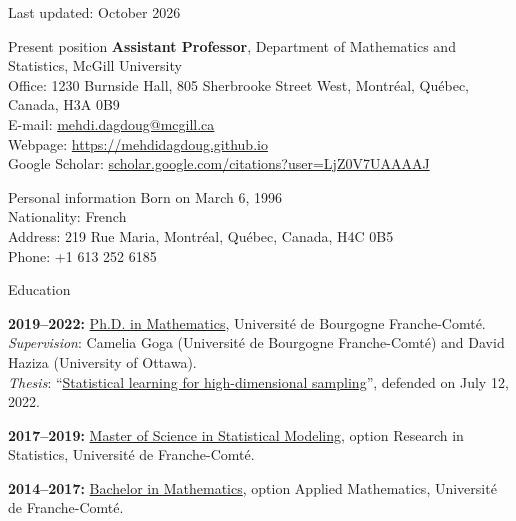 \documentclass{resume}
\newif\ifpersonal \personaltrue
\begin{document}
\vspace{-1.5em}
\begin{center}\small Last updated: October 2026\end{center}

\begin{rSection}{Present position}
\vspace{2mm}
\textbf{Assistant Professor}, Department of Mathematics and Statistics, McGill University \\[5pt]
Office: 1230 Burnside Hall, 805 Sherbrooke Street West, Montréal, Québec, Canada, H3A 0B9 \\[5pt]
E-mail: \href{mailto:mehdi.dagdoug@mcgill.ca}{mehdi.dagdoug@mcgill.ca} \\[5pt]
Webpage: \url{https://mehdidagdoug.github.io} \\[5pt]
Google Scholar: \href{https://scholar.google.com/citations?user=LjZ0V7UAAAAJ}{scholar.google.com/citations?user=LjZ0V7UAAAAJ}
\end{rSection}

\ifpersonal
\begin{rSection}{Personal information}
\vspace{2mm}
Born on March 6, 1996 \\[5pt]
Nationality: French \\[5pt]
Address: 219 Rue Maria, Montréal, Québec, Canada, H4C 0B5 \\[5pt]
Phone: +1 613 252 6185
\end{rSection}
\fi

\begin{rSection}{Education}
\vspace{2mm}

\textbf{2019--2022:} \underline{Ph.D. in Mathematics}, Université de Bourgogne Franche-Comté. \\
\emph{Supervision}: Camelia Goga (Université de Bourgogne Franche-Comté) and David Haziza (University of Ottawa). \\
\emph{Thesis}: ``\href{https://mehdidagdoug.github.io/files/these.pdf}{Statistical learning for high-dimensional sampling}'', defended on July 12, 2022.

\textbf{2017--2019:} \underline{Master of Science in Statistical Modeling}, option Research in Statistics, Université de Franche-Comté.

\textbf{2014--2017:} \underline{Bachelor in Mathematics}, option Applied Mathematics, Université de Franche-Comté.
\end{rSection}
\end{document}

